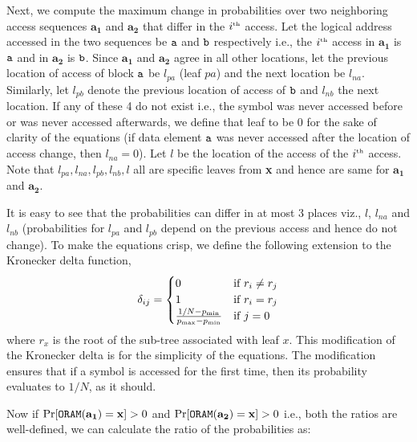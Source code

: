 \documentclass[USenglish,oneside,twocolumn]{article}
\begin{document}
Next, we compute the maximum change in probabilities over two neighboring access sequences $\mathbf{a_1}$ and $\mathbf{a_2}$ that differ in the $i^{{\tiny \mbox{th}}}$ access. Let the logical address accessed in the two sequences be  ${\tt a}$ and ${\tt b}$ respectively i.e., the $i^{{\tiny \mbox{th}}}$ access in $\mathbf{a_1}$ is ${\tt a}$ and in $\mathbf{a_2}$ is ${\tt b}$. Since $\mathbf{a_1}$ and $\mathbf{a_2}$ agree in all other locations, let the previous location of access of block ${\tt a}$ be $l_{pa}$ (leaf $pa$) and the next location be $l_{na}$. Similarly, let $l_{pb}$ denote the previous location of access of ${\tt b}$ and $l_{nb}$ the next location. If any of these 4 do not exist i.e., the symbol was never accessed before or was never accessed afterwards, we define that leaf to be $0$ for the sake of clarity of the equations (if data element ${\tt a}$ was never accessed after the location of access change, then $l_{na} = 0$). Let $l$ be the location of the access of the $i^{{\tiny \mbox{th}}}$ access. Note that $l_{pa}, l_{na}, l_{pb}, l_{nb}, l$ all are specific leaves from \textbf{x} and hence are same for  $\mathbf{a_1}$ and $\mathbf{a_2}$.



It is easy to see that the probabilities can differ in at most 3 places viz., $l$, $l_{na}$ and $l_{nb}$ (probabilities for $l_{pa}$ and $l_{pb}$ depend on the previous access and hence do not change). To make the equations crisp, we define the following extension to the Kronecker delta function, 
\begin{equation*}
\delta_{ij} = 
\begin{cases}
0 	& \text{if $r_i \neq r_j$}\\
1	& \text{if $r_i = r_j$} \\
\frac{1/N - p_{{\tiny \mbox{min}}}}{p_{{\tiny \mbox{max}}} - p_{{\tiny \mbox{min}}}}  & \text{if $j=0$}
\end{cases}
\end{equation*}
where $r_x$ is the root of the sub-tree associated with leaf $x$. This modification of the Kronecker delta is for the simplicity of the equations. The modification ensures that if a symbol is accessed for the first time, then its probability evaluates to $1/N$, as it should. 


Now if $\Pr [{\tt ORAM}(\mathbf{a_1}) = \mathbf{x}] > 0$ and $\Pr [{\tt ORAM}(\mathbf{a_2}) = \mathbf{x}] >0 $ i.e., both the ratios are well-defined, we can calculate the ratio of the probabilities as:
\end{document}
